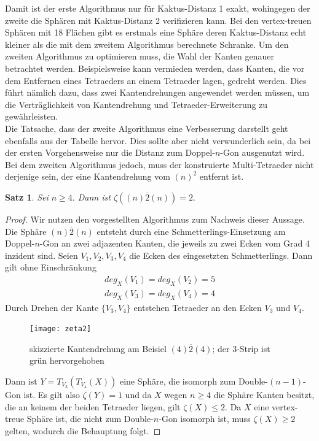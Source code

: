 \documentclass[12pt,titlepage,twoside,cleardoublepage]{article}
\theoremstyle{nummermitklammern}
\newtheorem{satz}[temp]{Satz}
\newtheorem{satz}[zahl]{Satz}
\numberwithin{equation}{section}
\begin{document}
Damit ist der erste Algorithmus nur für Kaktus-Distanz 1 exakt, wohingegen der zweite die Sphären mit Kaktus-Distanz 2 verifizieren kann. Bei den vertex-treuen Sphären mit 18 Flächen gibt es erstmals eine Sphäre deren Kaktus-Distanz echt kleiner als die mit dem zweitem Algorithmus berechnete Schranke.
Um den zweiten Algorithmus zu optimieren muss, die Wahl der Kanten genauer betrachtet werden. Beispielsweise kann vermieden werden, dass Kanten, die vor dem Entfernen eines Tetraeders an einem Tetraeder lagen, gedreht werden. Dies führt nämlich dazu, dass zwei Kantendrehungen angewendet werden müssen, um die Verträglichkeit von Kantendrehung und Tetraeder-Erweiterung zu gewährleisten.\\
Die Tatsache, dass der zweite Algorithmus eine Verbesserung darstellt geht ebenfalls aus der Tabelle hervor. Dies sollte aber nicht verwunderlich sein, da bei der ersten Vorgehensweise nur die Distanz zum Doppel-$n$-Gon  ausgenutzt wird. Bei dem zweiten Algorithmus jedoch, muss der konstruierte Multi-Tetraeder nicht derjenige sein, der eine Kantendrehung vom $(n)^2$ entfernt ist.
\begin{satz}
Sei $n \geq 4.$ Dann ist $\zeta((n)\overline{2}(n))=2.$
\end{satz}
\begin{proof}
Wir nutzen den vorgestellten Algorithmus zum Nachweis dieser Aussage.
Die Sphäre $(n)\overline{2}(n)$ entsteht durch eine Schmetterlings-Einsetzung am Doppel-$n$-Gon an zwei adjazenten Kanten, die jeweils zu zwei Ecken vom Grad 4 inzident sind. Seien $V_1,V_2,V_3,V_4$ die Ecken des eingesetzten Schmetterlings. Dann gilt ohne Einschränkung 
\begin{align*}
deg_X(V_1)=deg_X(V_2)=5\\
deg_X(V_3)=deg_X(V_4)=4
\end{align*}
Durch Drehen der Kante $\{V_3,V_4\}$ entstehen Tetraeder an den Ecken $V_3$ und $V_4.$ 
  
\begin{figure}[H]
\begin{center}
\texttt{[image: zeta2]}
\end{center}
\caption{skizzierte Kantendrehung am Beisiel $(4)\overline{2}(4)$; der 3-Strip ist grün hervorgehoben}
\end{figure}
Dann ist $Y=T_{V_3}(T_{V_4}(X))$ eine Sphäre, die isomorph zum Double-$(n-1)$-Gon ist. Es gilt also $\zeta (Y)=1$ und da $X$ wegen $n\geq 4$ die Sphäre Kanten besitzt, die an keinem der beiden Tetraeder liegen, gilt $\zeta (X)\leq 2.$ Da $X$ eine vertex-treue Sphäre ist, die nicht zum Double-$n$-Gon isomorph ist, muss $\zeta(X)\geq 2$ gelten, wodurch die Behauptung folgt. 
\end{proof}
\end{document}
